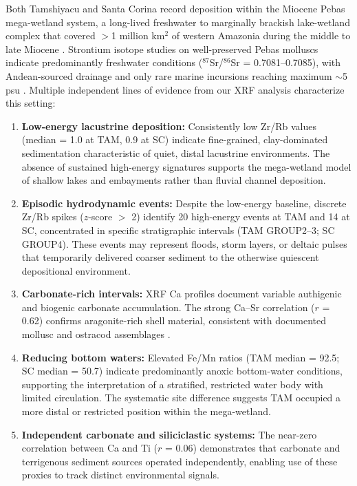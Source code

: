 \documentclass[11pt,a4paper]{article}
\begin{document}
Both Tamshiyacu and Santa Corina record deposition within the Miocene Pebas mega-wetland system, a long-lived freshwater to marginally brackish lake-wetland complex that covered $>$1 million km$^2$ of western Amazonia during the middle to late Miocene \citep{Wesselingh2006, Hoorn2010}. Strontium isotope studies on well-preserved Pebas molluscs indicate predominantly freshwater conditions ($^{87}$Sr/$^{86}$Sr = 0.7081--0.7085), with Andean-sourced drainage and only rare marine incursions reaching maximum $\sim$5 psu \citep{Vonhof2003, Boonstra2021}. Multiple independent lines of evidence from our XRF analysis characterize this setting:

\begin{enumerate}
    \item \textbf{Low-energy lacustrine deposition:} Consistently low Zr/Rb values (median = 1.0 at TAM, 0.9 at SC) indicate fine-grained, clay-dominated sedimentation characteristic of quiet, distal lacustrine environments. The absence of sustained high-energy signatures supports the mega-wetland model of shallow lakes and embayments rather than fluvial channel deposition.

    \item \textbf{Episodic hydrodynamic events:} Despite the low-energy baseline, discrete Zr/Rb spikes ($z$-score $>$ 2) identify 20 high-energy events at TAM and 14 at SC, concentrated in specific stratigraphic intervals (TAM GROUP2--3; SC GROUP4). These events may represent floods, storm layers, or deltaic pulses that temporarily delivered coarser sediment to the otherwise quiescent depositional environment.

    \item \textbf{Carbonate-rich intervals:} XRF Ca profiles document variable authigenic and biogenic carbonate accumulation. The strong Ca--Sr correlation ($r$ = 0.62) confirms aragonite-rich shell material, consistent with documented mollusc and ostracod assemblages \citep{Vonhof2003, Kaandorp2005}.

    \item \textbf{Reducing bottom waters:} Elevated Fe/Mn ratios (TAM median = 92.5; SC median = 50.7) indicate predominantly anoxic bottom-water conditions, supporting the interpretation of a stratified, restricted water body with limited circulation. The systematic site difference suggests TAM occupied a more distal or restricted position within the mega-wetland.

    \item \textbf{Independent carbonate and siliciclastic systems:} The near-zero correlation between Ca and Ti ($r$ = 0.06) demonstrates that carbonate and terrigenous sediment sources operated independently, enabling use of these proxies to track distinct environmental signals.
\end{enumerate}
\end{document}
